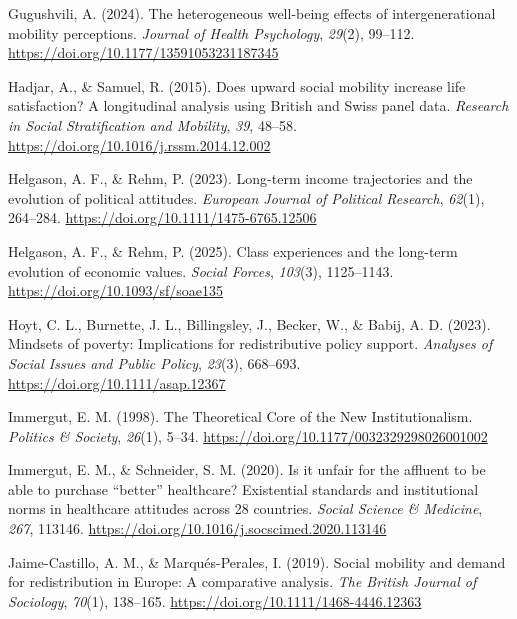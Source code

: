 \documentclass[
  13pt,
]{article}
\newlength{\cslhangindent}
\newenvironment{CSLReferences}[2] %
 {\begin{list}{}{%
  \setlength{\itemindent}{0pt}
  \setlength{\leftmargin}{0pt}
  \setlength{\parsep}{0pt}
  \ifodd #1
   \setlength{\leftmargin}{\cslhangindent}
   \setlength{\itemindent}{-1\cslhangindent}
  \fi
  \setlength{\itemsep}{#2\baselineskip}}}
 {\end{list}}
\begin{document}
\begin{CSLReferences}{1}{0}
Gugushvili, A. (2024). The heterogeneous well-being effects of
intergenerational mobility perceptions. \emph{Journal of Health
Psychology}, \emph{29}(2), 99--112.
\url{https://doi.org/10.1177/13591053231187345}

Hadjar, A., \& Samuel, R. (2015). Does upward social mobility increase
life satisfaction? {A} longitudinal analysis using {British} and {Swiss}
panel data. \emph{Research in Social Stratification and Mobility},
\emph{39}, 48--58. \url{https://doi.org/10.1016/j.rssm.2014.12.002}

Helgason, A. F., \& Rehm, P. (2023). Long-term income trajectories and
the evolution of political attitudes. \emph{European Journal of
Political Research}, \emph{62}(1), 264--284.
\url{https://doi.org/10.1111/1475-6765.12506}

Helgason, A. F., \& Rehm, P. (2025). Class experiences and the long-term
evolution of economic values. \emph{Social Forces}, \emph{103}(3),
1125--1143. \url{https://doi.org/10.1093/sf/soae135}

Hoyt, C. L., Burnette, J. L., Billingsley, J., Becker, W., \& Babij, A.
D. (2023). Mindsets of poverty: {Implications} for redistributive policy
support. \emph{Analyses of Social Issues and Public Policy},
\emph{23}(3), 668--693. \url{https://doi.org/10.1111/asap.12367}

Immergut, E. M. (1998). The {Theoretical Core} of the {New
Institutionalism}. \emph{Politics \& Society}, \emph{26}(1), 5--34.
\url{https://doi.org/10.1177/0032329298026001002}

Immergut, E. M., \& Schneider, S. M. (2020). Is it unfair for the
affluent to be able to purchase {``better''} healthcare? {Existential}
standards and institutional norms in healthcare attitudes across 28
countries. \emph{Social Science \& Medicine}, \emph{267}, 113146.
\url{https://doi.org/10.1016/j.socscimed.2020.113146}

Jaime-Castillo, A. M., \& Marqués-Perales, I. (2019). Social mobility
and demand for redistribution in {Europe}: A comparative analysis.
\emph{The British Journal of Sociology}, \emph{70}(1), 138--165.
\url{https://doi.org/10.1111/1468-4446.12363}


\end{CSLReferences}
\end{document}
